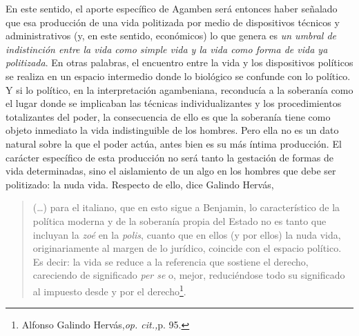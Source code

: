 \documentclass{book}
\begin{document}
En este sentido, el aporte específico de Agamben será entonces haber
señalado que esa producción de una vida politizada por medio de
dispositivos técnicos y administrativos (y, en este sentido, económicos)
lo que genera es \emph{un umbral de indistinción entre la vida como
simple vida y la vida como forma de vida ya politizada}. En otras
palabras, el encuentro entre la vida y los dispositivos políticos se
realiza en un espacio intermedio donde lo biológico se confunde con lo
político. Y si lo político, en la interpretación agambeniana, reconducía
a la soberanía como el lugar donde se implicaban las técnicas
individualizantes y los procedimientos totalizantes del poder, la
consecuencia de ello es que la soberanía tiene como objeto inmediato la
vida indistinguible de los hombres. Pero ella no es un dato natural
sobre la que el poder actúa, antes bien es su más íntima producción. El
carácter específico de esta producción no será tanto la gestación de
formas de vida determinadas, sino el aislamiento de un algo en los
hombres que debe ser politizado: la nuda vida. Respecto de ello, dice
Galindo Hervás,

\begin{quote}
(\dots) para el italiano, que en esto sigue a Benjamin, lo
característico de la política moderna y de la soberanía propia del
Estado no es tanto que incluyan la \emph{zoé} en la \emph{polis}, cuanto
que en ellos (y por ellos) la nuda vida, originariamente al margen de lo
jurídico, coincide con el espacio político. Es decir: la vida se reduce
a la referencia que sostiene el derecho, careciendo de significado
\emph{per se} o, mejor, reduciéndose todo su significado al impuesto
desde y por el derecho\footnote{Alfonso Galindo Hervás,\emph{op.
  cit.,}p. 95.}.
\end{quote}
\end{document}
